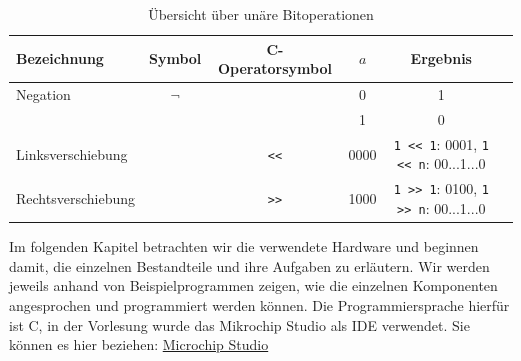\documentclass[11pt,a4paper]{scrartcl}
\begin{document}
\begin{table}[h]
\centering
\begin{tabular}{|l|c|c|c|c|c|}
\hline
Bezeichnung & Symbol & C-Operatorsymbol & $a$ & Ergebnis \\
\hline
Negation & $\lnot$ & \texttt{~} & 0 & 1 \\
&&&1 & 0 \\
\hline
Linksverschiebung & &\texttt{<<} & 0000 & \texttt{1 << 1}: 0001, \texttt{1 << n}: 00...1...0 \\
\hline
Rechtsverschiebung & & \texttt{>>} & 1000 & \texttt{1 >> 1}: 0100, \texttt{1 >> n}: 00...1...0 \\
\hline
\end{tabular}
\caption{Übersicht über unäre Bitoperationen}
\end{table}

Im folgenden Kapitel betrachten wir die verwendete Hardware und beginnen damit, die einzelnen Bestandteile und ihre Aufgaben zu erläutern. Wir werden jeweils anhand von Beispielprogrammen zeigen, wie die einzelnen Komponenten angesprochen und programmiert werden können. Die Programmiersprache hierfür ist C, in der Vorlesung wurde das {\glqq}Mikrochip Studio{\grqq} als IDE verwendet. Sie können es hier beziehen: 
\href{https://www.microchip.com/en-us/development-tools-tools-and-software/microchip-studio-for-avr-and-sam-devices}{Microchip Studio}
\end{document}
